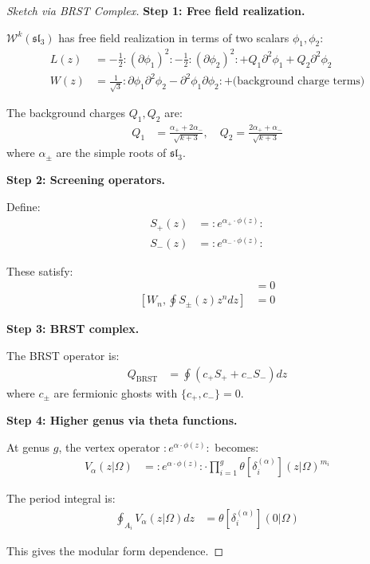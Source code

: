 \begin{proof}[Sketch via BRST Complex]
\textbf{Step 1: Free field realization.}

$\mathcal{W}^k(\mathfrak{sl}_3)$ has free field realization in terms of two scalars $\phi_1, \phi_2$:
\begin{align}
L(z) &= -\frac{1}{2}:(\partial\phi_1)^2: - \frac{1}{2}:(\partial\phi_2)^2: + Q_1 \partial^2\phi_1 + Q_2 \partial^2\phi_2 \\
W(z) &= \frac{1}{\sqrt{3}} :\partial\phi_1 \partial^2\phi_2 - \partial^2\phi_1 \partial\phi_2: + \text{(background charge terms)}
\end{align}

The background charges $Q_1, Q_2$ are:
\begin{align}
Q_1 &= \frac{\alpha_+ + 2\alpha_-}{\sqrt{k+3}}, \quad Q_2 = \frac{2\alpha_+ + \alpha_-}{\sqrt{k+3}}
\end{align}
where $\alpha_\pm$ are the simple roots of $\mathfrak{sl}_3$.

\textbf{Step 2: Screening operators.}

Define:
\begin{align}
S_+(z) &= :e^{\alpha_+ \cdot \phi(z)}: \\
S_-(z) &= :e^{\alpha_- \cdot \phi(z)}:
\end{align}

These satisfy:
\begin{align}
[L_n, \oint S_\pm(z) z^{n} dz] &= 0 \\
[W_n, \oint S_\pm(z) z^{n} dz] &= 0
\end{align}

\textbf{Step 3: BRST complex.}

The BRST operator is:
\begin{align}
Q_{\text{BRST}} &= \oint (c_+ S_+ + c_- S_-) dz
\end{align}
where $c_\pm$ are fermionic ghosts with $\{c_+, c_-\} = 0$.

\textbf{Step 4: Higher genus via theta functions.}

At genus $g$, the vertex operator $:e^{\alpha \cdot \phi(z)}:$ becomes:
\begin{align}
V_\alpha(z|\Omega) &= :e^{\alpha \cdot \phi(z)}: \cdot \prod_{i=1}^g \theta[\delta_i^{(\alpha)}](z|\Omega)^{m_i}
\end{align}

The period integral is:
\begin{align}
\oint_{A_i} V_\alpha(z|\Omega) dz &= \theta[\delta_i^{(\alpha)}](0|\Omega)
\end{align}

This gives the modular form dependence.
\end{proof}


